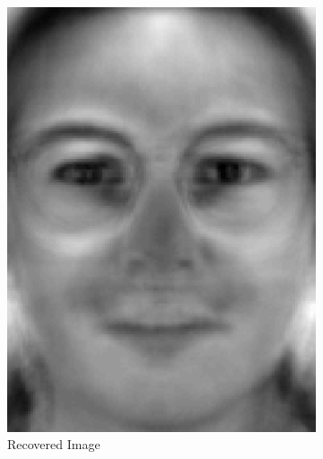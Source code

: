 \documentclass[review]{elsarticle}
\begin{document}
\begin{figure}[H]
\begin{subfigure}[b]{0.18\textwidth} 
\centering
	\includegraphics[width=\linewidth]{Fig_4b}
		\caption{Recovered Image}
	\label{fig:recov_image_ex_2} \hfill
\end{subfigure}
\begin{subfigure}[b]{0.18\textwidth} 
\centering

\end{subfigure}
\end{figure}
\end{document}

